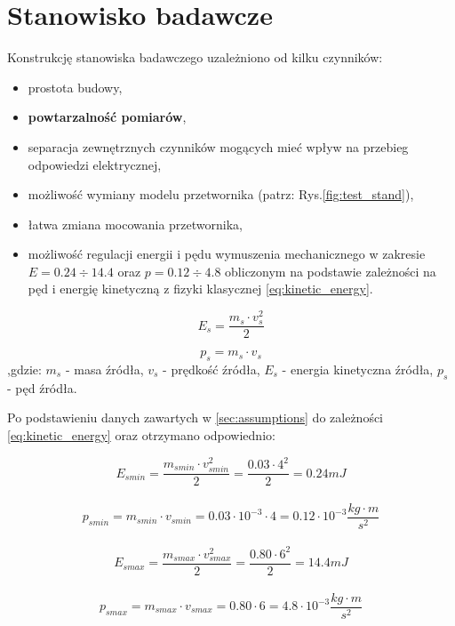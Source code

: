 \chapter{Stanowisko badawcze}
\label{sec:test_stand}

Konstrukcję stanowiska badawczego uzależniono od kilku czynników:
\begin{itemize}
\item prostota budowy,
\item \textbf{powtarzalność pomiarów},
\item separacja zewnętrznych czynników mogących mieć wpływ na przebieg odpowiedzi elektrycznej,
\item możliwość wymiany modelu przetwornika (patrz: Rys.\ref{fig:test_stand}),
\item łatwa zmiana mocowania przetwornika,
\item możliwość regulacji energii i pędu wymuszenia mechanicznego w zakresie \textbf{$E = 0.24\div14.4$} oraz \textbf{$p = 0.12\div4.8$} obliczonym na podstawie zależności na pęd i energię kinetyczną z fizyki klasycznej \ref{eq:kinetic_energy}.
\end{itemize}

\begin{equation}
E_{s} = \frac{m_{s} \cdot v_{s}^2}{2}
\label{eq:kinetic_energy}
\end{equation}

\begin{equation}
p_{s} = m_{s} \cdot v_{s}
\label{eq:inertia}
\end{equation}
,gdzie: $ m_s$ - masa źródła, $v_s$ - prędkość źródła, $E_s$ - energia kinetyczna źródła, $p_s$ - pęd źródła.

Po podstawieniu danych zawartych w \ref{sec:assumptions} do zależności \ref{eq:kinetic_energy} oraz otrzymano odpowiednio:


$$E_{smin} = \frac{m_{smin} \cdot v_{smin}^2}{2}=\frac{{0.03}\cdot4^2}{2} = {0.24} mJ$$
\\$$p_{smin} = m_{smin} \cdot v_{smin} = {0.03}\cdot 10^{-3} \cdot 4 = {0.12} \cdot 10^{-3}\frac{kg \cdot m}{s^2}$$
\\$$E_{smax} = \frac{m_{smax} \cdot v_{smax}^2}{2}=\frac{0.80\cdot6^2}{2} = 14.4 mJ$$
\\$$p_{smax} = m_{smax} \cdot v_{smax} = 0.80 \cdot 6 = 4.8 \cdot 10^{-3} \frac{kg \cdot m}{s^2}$$


